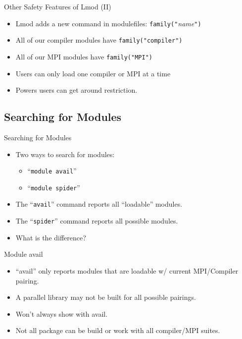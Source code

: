 \documentclass{beamer}
\begin{document}
\begin{frame}{Other Safety Features of Lmod (II)}
  \begin{itemize}
    \item Lmod adds a new command in modulefiles: \texttt{family("}\emph{name}\texttt{")}
    \item All of our compiler modules have \texttt{family("compiler")}
    \item All of our MPI modules have \texttt{family("MPI")}
    \item Users can only load one compiler or MPI at a time
    \item Powers users can get around restriction.
  \end{itemize}
\end{frame}

\subsection{Searching for Modules}
\label{sec:search}


\begin{frame}{Searching for Modules}
  \begin{itemize}
    \item Two ways to search for modules:
      \begin{itemize}
        \item ``\texttt{module avail}''
        \item ``\texttt{module spider}''
      \end{itemize}
    \item The ``\texttt{avail}''  command reports all ``loadable'' modules.
    \item The ``\texttt{spider}'' command reports all possible modules.
    \item What is the difference?
  \end{itemize}
\end{frame}

\begin{frame}{Module avail}
  \begin{itemize}
    \item ``avail'' only reports modules that are loadable w/ current
      MPI/Compiler pairing.
    \item A parallel library may not be built for all possible pairings.
    \item Won't always show with avail.
    \item Not all package can be build or work with all compiler/MPI suites.
  \end{itemize}
\end{frame}
\end{document}
